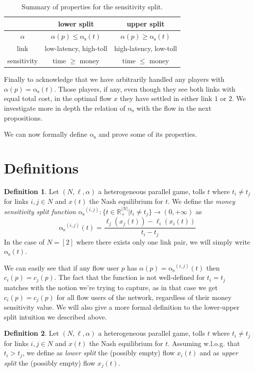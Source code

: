 \documentclass[10pt,a4paper]{book}
\newcommand{\as}{\mathrm{\alpha_s}}
\newcommand{\R}{\mathbb{R}}
\theoremstyle{definition}
\newtheorem{definition}{Definition}[chapter]
\theoremstyle{comment}
\begin{document}
\begin{table}[h!]
	\centering
	\caption{Summary of properties for the sensitivity split.}
	\begin{tabular}{| c || c | c |}
		\hline
		& \textbf{lower split} & \textbf{upper split} \\ \hline
		$\alpha$ & $\alpha(p) \le \as(t)$ & $\alpha(p) \ge \as(t)$ \\ \hline
		link & low-latency, high-toll & high-latency, low-toll \\ \hline
		sensitivity & time $\ge$ money & time $\le$ money \\ \hline
	\end{tabular}
	\label{table:split_summary}
\end{table}

Finally to acknowledge that we have arbitrarily handled any players with $\alpha(p) = \as(t)$.
Those players, if any, even though they see both links with equal total cost, in the optimal flow $x$ they have settled in either link $1$ or $2$.
We investigate more in depth the relation of $\as$ with the flow in the next propositions.

We can now formally define $\as$ and prove some of its properties.

\section{Definitions}

\begin{definition}
	\label{definition:split_function}
	Let $(N, \ell, \alpha)$ a heterogeneous parallel game, tolls $t$ where $t_i \ne t_j$ for links $i, j \in N$ and $x(t)$ the Nash equilibrium for $t$.
	We define the \textit{money sensitivity split function} $\as^{(i, j)}: \{t \in \R_+^{|N|}|t_i \ne t_j\} \rightarrow (0, +\infty)$ as
	\[\as^{(i, j)}(t) = \frac{\ell_j(x_j(t)) - \ell_i(x_i(t))}{t_i - t_j}\]
	In the case of $N = [2]$ where there exists only one link pair, we will simply write $\as(t)$.
\end{definition}
We can easily see that if any flow user $p$ has $\alpha(p) = \as^{(i, j)}(t)$ then $c_i(p) = c_j(p)$.
The fact that the function is not well-defined for $t_i = t_j$ matches with the notion we're trying to capture, as in that case we get $c_i(p) = c_j(p)$ for all flow users of the network, regardless of their money sensitivity value.
We will also give a more formal definition to the lower-upper split intuition we described above.
\begin{definition}
	\label{definition:split_lower_upper}
	Let $(N, \ell, \alpha)$ a heterogeneous parallel game, tolls $t$ where $t_i \ne t_j$ for links $i, j \in N$ and $x(t)$ the Nash equilibrium for $t$.
	Assuming w.l.o.g. that $t_i > t_j$, we define as \textit{lower split} the (possibly empty) flow $x_i(t)$ and as \textit{upper split} the (possibly empty) flow $x_j(t)$. 
\end{definition}
\end{document}
